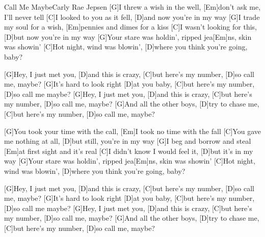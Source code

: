 \documentclass[../main.tex]{subfiles}
\begin{document}
\begin{song}{Call Me Maybe}{Carly Rae Jepsen}{}
[G]I threw a wish in the well, [Em]don't ask me, I'll never tell
[C]I looked to you as it fell, [D]and now you're in my way
[G]I trade my soul for a wish, [Em]pennies and dimes for a kiss
[C]I wasn't looking for this, [D]but now you're in my way
[G]Your stare was holdin', ripped jea[Em]ns, skin was showin'
[C]Hot night, wind was blowin', [D]where you think you're going, baby?

[G]Hey, I just met you, [D]and this is crazy,
[C]but here's my number, [D]so call me, maybe?
[G]It's hard to look right [D]at you baby,
[C]but here's my number, [D]so call me maybe?
[G]Hey, I just met you, [D]and this is crazy,
[C]but here's my number, [D]so call me, maybe?
[G]And all the other boys, [D]try to chase me,
[C]but here's my number, [D]so call me, maybe?

[G]You took your time with the call, [Em]I took no time with the fall
[C]You gave me nothing at all, [D]but still, you're in my way
[G]I beg and borrow and steal [Em]at first sight and it's real
[C]I didn't know I would feel it, [D]but it's in my way
[G]Your stare was holdin', ripped jea[Em]ns, skin was showin'
[C]Hot night, wind was blowin', [D]where you think you're going, baby?

[G]Hey, I just met you, [D]and this is crazy,
[C]but here's my number, [D]so call me, maybe?
[G]It's hard to look right [D]at you baby,
[C]but here's my number, [D]so call me maybe?
[G]Hey, I just met you, [D]and this is crazy,
[C]but here's my number, [D]so call me, maybe?
[G]And all the other boys, [D]try to chase me,
[C]but here's my number, [D]so call me, maybe?
\end{song}
\end{document}
